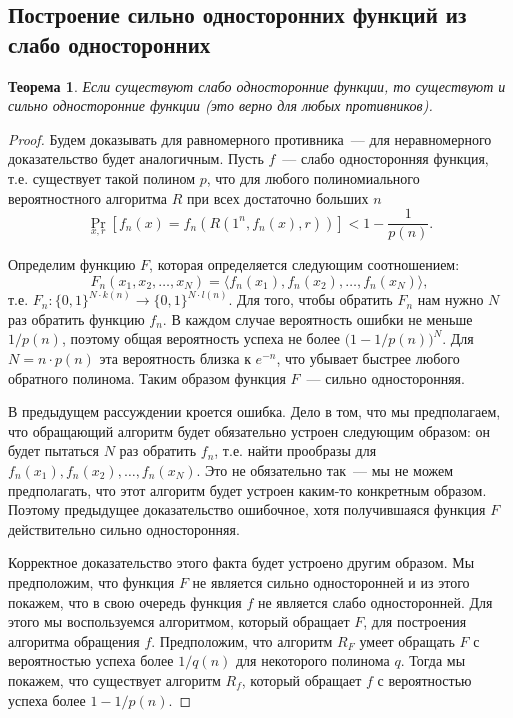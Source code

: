 \documentclass[12pt]{article}
\newcommand{\bits}{\{0,1\}}
\theoremstyle{definition}
\theoremstyle{plain}
\newtheorem{theorem}{Теорема}[section]
\theoremstyle{remark}
\begin{document}
\subsection{Построение сильно односторонних функций из слабо односторонних}
\begin{theorem}
Если существуют слабо односторонние функции, то существуют и сильно односторонние функции (это верно для любых противников).
\end{theorem}
\begin{proof}
Будем доказывать для равномерного противника~--- для неравномерного доказательство будет аналогичным. 
Пусть $f$~--- слабо односторонняя функция, т.е.
существует такой полином $p$, что для любого полиномиального вероятностного алгоритма $R$
при всех достаточно больших $n$
$$\Pr_{x,r}[f_n(x) = f_n(R(1^n, f_n(x), r))] < 1 - \frac{1}{p(n)}.$$

Определим функцию $F$, которая определяется следующим соотношением:
$$F_n(x_1,x_2,\dotsc,x_N) = \langle f_n(x_1), f_n(x_2), \dotsc, f_n(x_N) \rangle,$$
т.е. $F_n : \bits^{N\cdot k(n)} \to \bits^{N\cdot l(n)}$. Для того, чтобы обратить $F_n$ нам нужно $N$ раз обратить функцию $f_n$. В каждом случае вероятность ошибки не меньше $1/p(n)$, поэтому общая вероятность успеха не более $\bigl(1-1/p(n)\bigr)^N$.
Для $N = n\cdot p(n)$ эта вероятность близка к $e^{-n}$, что убывает быстрее любого обратного полинома.
Таким образом функция $F$~--- сильно односторонняя.

В предыдущем рассуждении кроется ошибка. Дело в том, что мы предполагаем, что обращающий
алгоритм будет обязательно устроен следующим образом: он будет пытаться $N$ раз обратить
$f_n$, т.е. найти прообразы для $f_n(x_1),f_n(x_2),\dotsc,f_n(x_N)$. 
Это не обязательно так~--- мы не можем предполагать, что этот алгоритм будет
устроен каким-то конкретным образом. Поэтому предыдущее доказательство ошибочное, 
хотя получившаяся функция $F$ действительно сильно односторонняя.

Корректное доказательство этого факта будет устроено другим образом. Мы предположим, что
функция $F$ не является сильно односторонней и из этого покажем, что в свою
очередь функция $f$ не является слабо односторонней. Для этого мы воспользуемся
алгоритмом, который обращает $F$, для построения алгоритма обращения $f$. 
Предположим, что алгоритм $R_F$ умеет обращать $F$ с вероятностью успеха 
более $1/q(n)$ для некоторого полинома $q$. Тогда мы покажем, что 
существует алгоритм $R_f$, который обращает $f$ с вероятностью успеха более
$1 - 1/p(n)$.


\end{proof}
\end{document}
